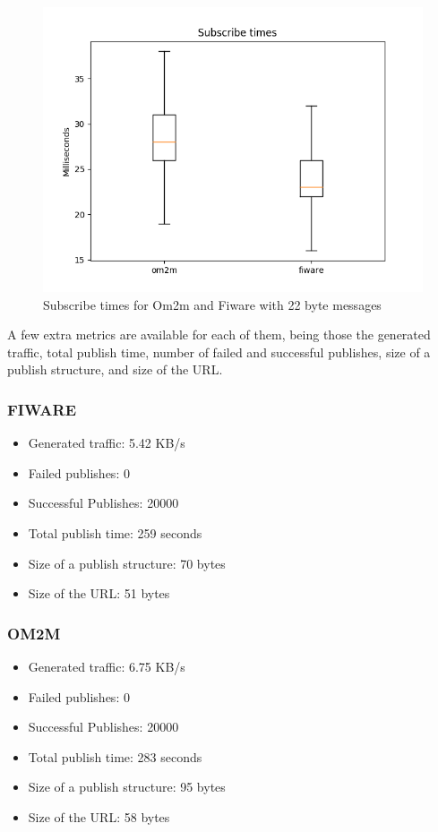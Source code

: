 \documentclass[conference]{IEEEtran}
\begin{document}
\begin{figure}[htbp!]
  \centering
  \includegraphics[width=\columnwidth]{figures/om2m_fiware_subscribe_times.png}
  \caption{Subscribe times for Om2m and Fiware with 22 byte messages}
  \label{fig:subscribe_times}
\end{figure}

A few extra metrics are available for each of them, being those the generated traffic, total publish time, number of failed and successful publishes, size of a publish structure, and size of the URL.

\subsubsection{FIWARE}
\begin{itemize}
\item Generated traffic: 5.42 KB/s
\item Failed publishes: 0
\item Successful Publishes: 20000
\item Total publish time: 259 seconds
\item Size of a publish structure: 70 bytes
\item Size of the URL: 51 bytes
\end{itemize}

\subsubsection{OM2M}
\begin{itemize}
\item Generated traffic: 6.75 KB/s
\item Failed publishes: 0
\item Successful Publishes: 20000
\item Total publish time: 283 seconds
\item Size of a publish structure: 95 bytes
\item Size of the URL: 58 bytes
\end{itemize}
\end{document}
